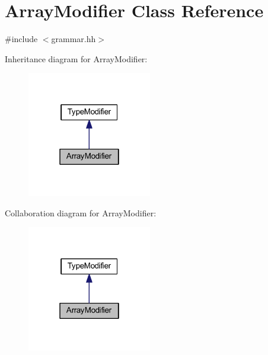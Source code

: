 \hypertarget{class_array_modifier}{}\section{Array\+Modifier Class Reference}
\label{class_array_modifier}


{\ttfamily \#include $<$grammar.\+hh$>$}



Inheritance diagram for Array\+Modifier\+:
\nopagebreak
\begin{figure}[H]
\begin{center}
\leavevmode
\includegraphics[width=154pt]{class_array_modifier__inherit__graph}
\end{center}
\end{figure}


Collaboration diagram for Array\+Modifier\+:
\nopagebreak
\begin{figure}[H]
\begin{center}
\leavevmode
\includegraphics[width=154pt]{class_array_modifier__coll__graph}
\end{center}
\end{figure}
